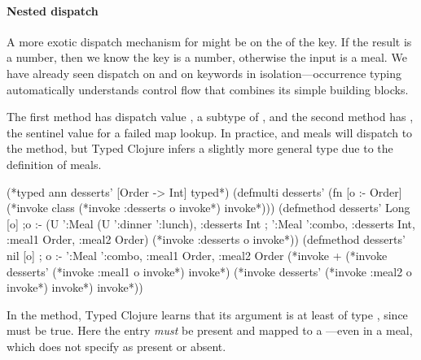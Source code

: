 \paragraph{Nested dispatch}
A more exotic dispatch mechanism for 
might be on the  of the  key.
If the result is a number, then we know the 
key is a number, otherwise the input is a  meal.
We have already seen dispatch on  and on keywords
in isolation---occurrence typing automatically understands
control flow that combines its simple building blocks.

The first method has dispatch value , a subtype
of , and the second method has , the sentinel value for a failed map lookup.
In practice,  and  meals will dispatch to the 
method, but Typed Clojure infers a slightly more general type due to the definition
of  meals.

\begin{minipage}{\linewidth}
\begin{exmp}
\begin{cljlisting}
(*typed ann desserts' [Order -> Int] typed*)
(defmulti desserts' 
  (fn [o :- Order] (*invoke class (*invoke :desserts o invoke*) invoke*)))
(defmethod desserts' Long [o] 
;o :- (U '{:Meal (U ':dinner ':lunch), :desserts Int}
;       '{:Meal ':combo, :desserts Int, :meal1 Order, :meal2 Order})
  (*invoke :desserts o invoke*))
(defmethod desserts' nil [o]
  ; o :- '{:Meal ':combo, :meal1 Order, :meal2 Order}
  (*invoke + (*invoke desserts' (*invoke :meal1 o invoke*) invoke*) (*invoke desserts' (*invoke :meal2 o invoke*) invoke*) invoke*))
\end{cljlisting}
\label{example:desserts-on-class}
\end{exmp}
\end{minipage}
%

In the  method, Typed Clojure learns that
its argument is at least of type , since
must be true.
%
Here the
 entry
\emph{must} be present and mapped to a ---even in a  meal,
which does not specify 
as present or absent.

